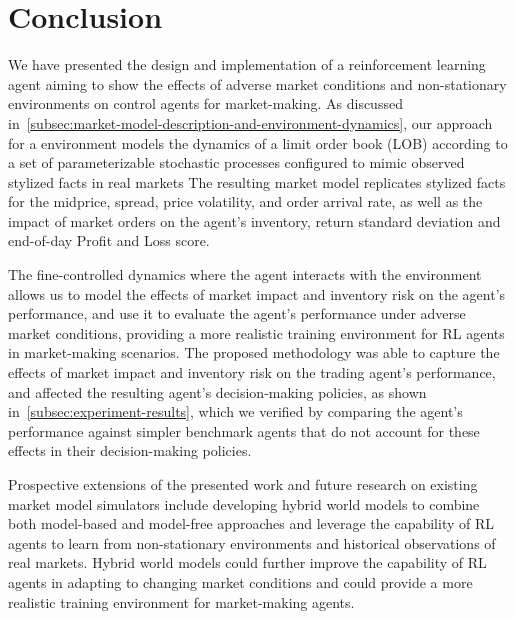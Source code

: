 \section{Conclusion}
\label{sec:conclusion}
We have presented the design and implementation of a reinforcement learning agent aiming to show
the effects of adverse market conditions and non-stationary environments on control agents for market-making.
As discussed in~\autoref{subsec:market-model-description-and-environment-dynamics},
our approach for a environment models the dynamics of a limit order book (LOB)
according to a set of parameterizable stochastic processes configured to mimic observed stylized facts in real markets
The resulting market model replicates stylized facts for the midprice, spread, price volatility, and order arrival rate,
as well as the impact of market orders on the agent's inventory, return standard deviation and end-of-day Profit and Loss score.

The fine-controlled dynamics where the agent interacts with the environment allows us to model the effects of market impact and inventory risk on the agent's performance,
and use it to evaluate the agent's performance under adverse market conditions, providing a more realistic training environment for RL agents in market-making scenarios.
The proposed methodology was able to capture the effects of market impact and inventory risk on the trading agent's performance,
and affected the resulting agent's decision-making policies, as shown in~\autoref{subsec:experiment-results},
which we verified by comparing the agent's performance against simpler benchmark agents that
do not account for these effects in their decision-making policies.

Prospective extensions of the presented work and future research on existing market model simulators include
developing hybrid world models to combine both model-based and model-free approaches and leverage the capability of RL agents
to learn from non-stationary environments and historical observations of real markets.
Hybrid world models could further improve the capability of RL agents in adapting to changing market conditions
and could provide a more realistic training environment for market-making agents.
